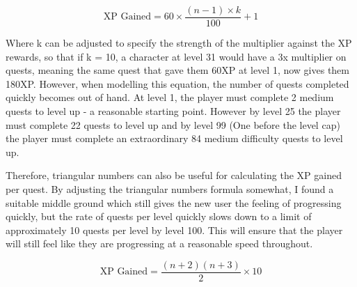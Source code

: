 \begin{equation} \label{eq:xpgainedlinear}
	\textrm{XP Gained} = 60 \times \frac{(n - 1) \times k}{100} + 1
\end{equation}

Where k can be adjusted to specify the strength of the multiplier against the XP rewards, so that if k = 10, a character at level 31 would have a 3x multiplier on quests, meaning the same quest that gave them 60XP at level 1, now gives them 180XP.
However, when modelling this equation, the number of quests completed quickly becomes out of hand. 
At level 1, the player must complete 2 medium quests to level up - a reasonable starting point.
However by level 25 the player must complete 22 quests to level up and by level 99 (One before the level cap) the player must complete an extraordinary 84 medium difficulty quests to level up.

Therefore, triangular numbers can also be useful for calculating the XP gained per quest. By adjusting the triangular numbers formula somewhat, I found a suitable middle ground which still gives the new user the feeling of progressing quickly, but the rate of quests per level quickly slows down to a limit of approximately 10 quests per level by level 100.
This will ensure that the player will still feel like they are progressing at a reasonable speed throughout.

\begin{equation} \label{eq:xpgainedtriangular}
	\textrm{XP Gained} = \frac{(n+2)(n+3)}{2} \times 10
\end{equation}

\begin{center}
\end{center}

